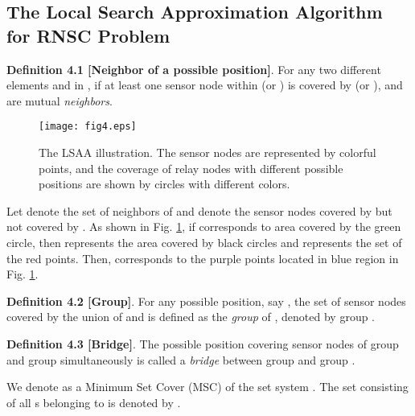 \documentclass[journal]{IEEEtran}
\begin{document}
\subsection{The Local Search Approximation Algorithm for RNSC Problem}
\textbf{Definition 4.1 [Neighbor of a possible position]}. For any two different elements  and  in , if at least one sensor node within  (or ) is covered by  (or ),  and  are mutual \emph{neighbors}.

\begin{figure}
\begin{center}
\texttt{[image: fig4.eps]}    \caption{The LSAA illustration. The sensor nodes are represented by colorful points, and the coverage of relay nodes with different possible
positions are shown by circles with different colors.}
\label{fig4}                                 \end{center}                                 \end{figure}

Let  denote the set of neighbors of  and  denote the sensor nodes covered by  but not covered by . As shown in Fig. \ref{fig4}, if  corresponds to area covered by the green circle, then  represents the area covered by black circles and  represents the set of the red points. Then,  corresponds to the purple points located in blue region in Fig. \ref{fig4}.

\textbf{Definition 4.2 [Group]}. For any possible position, say , the set of sensor nodes covered by the union of  and  is defined as the \emph{group} of , denoted by group .

\textbf{Definition 4.3 [Bridge]}. The possible position covering sensor nodes of group  and group  simultaneously is called a \emph{bridge} between group  and group .

We denote  as a Minimum Set Cover (MSC) of the set system . The set consisting of all s belonging to  is denoted by .
\end{document}
